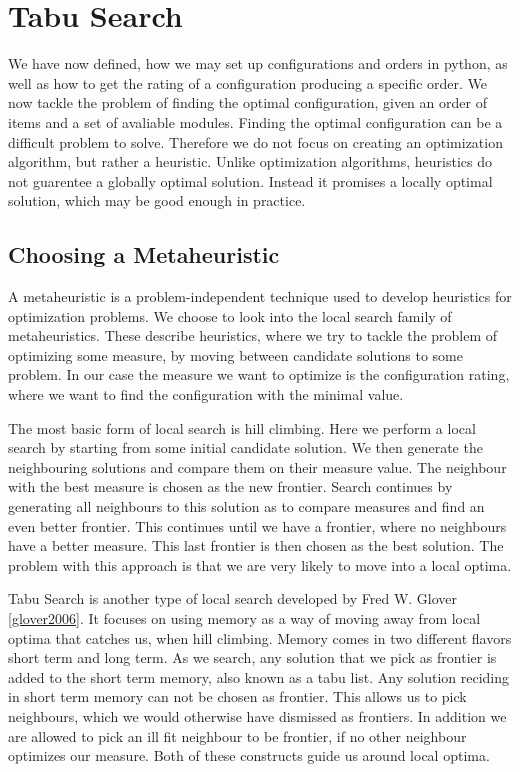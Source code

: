 \section{Tabu Search}
We have now defined, how we may set up configurations and orders in python, as well as how to get the rating of a configuration producing a specific order. We now tackle the problem of finding the optimal configuration, given an order of items and a set of avaliable modules. Finding the optimal configuration can be a difficult problem to solve. Therefore we do not focus on creating an optimization algorithm, but rather a heuristic. Unlike optimization algorithms, heuristics do not guarentee a globally optimal solution. Instead it promises a locally optimal solution, which may be good enough in practice.

\subsection{Choosing a Metaheuristic}
A metaheuristic is a problem-independent technique used to develop heuristics for optimization problems. We choose to look into the local search family of metaheuristics. These describe heuristics, where we try to tackle the problem of optimizing some measure, by moving between candidate solutions to some problem. In our case the measure we want to optimize is the configuration rating, where we want to find the configuration with the minimal value.

The most basic form of local search is hill climbing. Here we perform a local search by starting from some initial candidate solution. We then generate the neighbouring solutions and compare them on their measure value. The neighbour with the best measure is chosen as the new frontier. Search continues by generating all neighbours to this solution as to compare measures and find an even better frontier. This continues until we have a frontier, where no neighbours have a better measure. This last frontier is then chosen as the best solution. The problem with this approach is that we are very likely to move into a local optima. 

Tabu Search is another type of local search developed by Fred W. Glover \cref{glover2006}. It focuses on using memory as a way of moving away from local optima that catches us, when hill climbing. Memory comes in two different flavors short term and long term. As we search, any solution that we pick as frontier is added to the short term memory, also known as a tabu list. Any solution reciding in short term memory can not be chosen as frontier. This allows us to pick neighbours, which we would otherwise have dismissed as frontiers. In addition we are allowed to pick an ill fit neighbour to be frontier, if no other neighbour optimizes our measure. Both of these constructs guide us around local optima.

